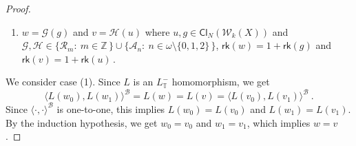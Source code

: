 \documentclass[10pt,a4paper, openany,  oldfontcommands]{memoir}
\newtheorem{open problem} [theorem] {Open Problem}
\newtheorem{open question} [theorem] {Open Question}
\begin{document}
\begin{proof}
\begin{enumerate}
\item   $  w  =    \mathcal{G}  \left(  g   \right)  $  and  $  v =  \mathcal{H}  \left(  u \right)   $
where  $ u,  g  \in     \mathsf{Cl}_{N}  \left(  \mathcal{W}_{k}  \left( X  \right)   \right)     $
and  $  \mathcal{G} ,   \mathcal{H}      \in  \lbrace  \mathcal{R}_m   :  \   m  \in  \mathbb{Z} \,   \rbrace   \cup 
 \lbrace  \mathcal{A}_n :  \   n  \in    \omega  \setminus \lbrace 0, 1 ,  2    \rbrace  \,   \rbrace      $, 
   $  \mathsf{rk} \left(  w  \right)  =  1  +  \mathsf{rk} \left(  g \right)    $
and    $  \mathsf{rk} \left(  v  \right)  =  1  +  \mathsf{rk} \left(  u \right)       \,   $.
\end{enumerate} 
 We consider case (1). 
Since  $  L $  is an $  L_{  \mathbb{T} }^-  $  homomorphism,  we get  
\[
 \langle  L(w_0) ,  L( w_1)  \rangle^{  \mathcal{B}  }  
 =   L(w)   =  L(v)   =  
  \langle  L(v_0) ,  L( v_1)  \rangle^{  \mathcal{B}  }  
\     .
\]
Since  $  \langle  \cdot  ,  \cdot   \rangle^{  \mathcal{B}  }   $  is one-to-one,  
this implies  $  L(w_0) = L(v_0) $  and  $  L(w_1) = L(v_1) $. 
By the induction hypothesis,   we get $  w_0 = v_0 $  and  $  w_1= v_1 $, 
which implies  $  w = v $. 

 
 
 
 

\end{proof}
\end{document}
